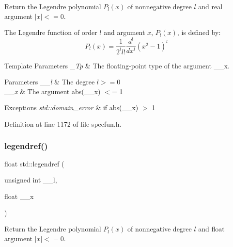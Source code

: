 Return the Legendre polynomial $ P_l(x) $ of nonnegative degree $ l $ and real argument $ |x| <= 0 $.

The Legendre function of order $ l $ and argument $ x $, $ P_l(x) $, is defined by\+: \[ P_l(x) = \frac{1}{2^l l!}\frac{d^l}{dx^l}(x^2 - 1)^{l} \]


\begin{DoxyTemplParams}{Template Parameters}
{\em \+\_\+\+Tp} & The floating-\/point type of the argument {\ttfamily \+\_\+\+\_\+x}. \\
\hline
\end{DoxyTemplParams}

\begin{DoxyParams}{Parameters}
{\em \+\_\+\+\_\+l} & The degree $ l >= 0 $ \\
\hline
{\em \+\_\+\+\_\+x} & The argument {\ttfamily abs(\+\_\+\+\_\+x)} $<$= 1 \\
\hline
\end{DoxyParams}

\begin{DoxyExceptions}{Exceptions}
{\em std\+::domain\+\_\+error} & if {\ttfamily abs(\+\_\+\+\_\+x)} $>$ 1 \\
\hline
\end{DoxyExceptions}


Definition at line 1172 of file specfun.\+h.

\mbox{\label{group__tr29124__math__spec__func_gaed94e3c664c99f5204da75be75aeac21}} 
\subsubsection{\texorpdfstring{legendref()}{legendref()}}
{\footnotesize\ttfamily float std\+::legendref (\begin{DoxyParamCaption}\item[{unsigned int}]{\+\_\+\+\_\+l,  }\item[{float}]{\+\_\+\+\_\+x }\end{DoxyParamCaption})\hspace{0.3cm}{\ttfamily [inline]}}

Return the Legendre polynomial $ P_l(x) $ of nonnegative degree $ l $ and {\ttfamily float} argument $ |x| <= 0 $.

